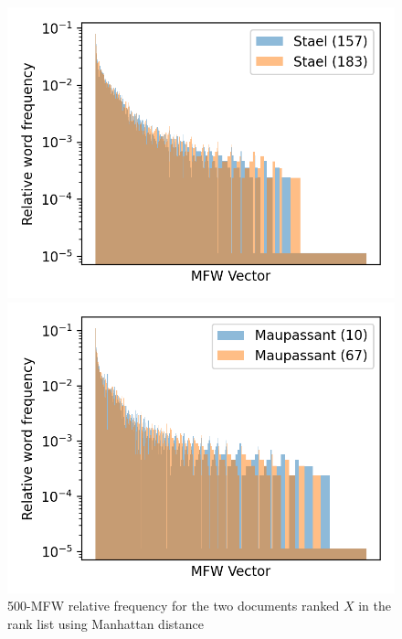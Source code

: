 \begin{figure}
  \centering
  \caption{500-MFW relative frequency for the two documents ranked $X$ in the rank list using Manhattan distance}

  \label{fig:mfw_vector_first_rl}
  \includegraphics[width=\linewidth]{img/mfw_vector_first_rl.png}

  \label{fig:mfw_vector_first_last_rl}
  \includegraphics[width=\linewidth]{img/mfw_vector_first_last_rl.png}


\end{figure}
